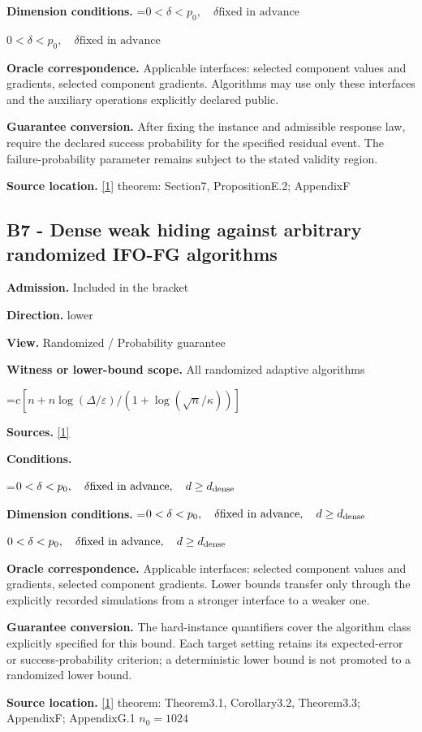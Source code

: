 \documentclass[10pt,a4paper]{article}
\newcommand{\AtlasMath}[1]{\par\begingroup\centering\setbox0=\hbox{$\displaystyle #1$}\ifdim\wd0>1.4\linewidth\typeout{ATLAS WIDE FORMULA: \the\wd0}\fi\ifdim\wd0>\linewidth\resizebox{\linewidth}{!}{\box0}\else\box0\fi\par\endgroup}
\newcommand{\AtlasInlineMath}[1]{\begingroup\setbox0=\hbox{$#1$}\ifdim\wd0>.4\linewidth\endgroup\AtlasMath{#1}\else\endgroup$#1$\fi}
\begin{document}
\textbf{Dimension conditions.} \AtlasInlineMath{0<\delta<p_0,\quad\delta\text{fixed in advance}}

\textbf{Oracle correspondence.} Applicable interfaces: selected component values and gradients, selected component gradients. Algorithms may use only these interfaces and the auxiliary operations explicitly declared public.

\textbf{Guarantee conversion.} After fixing the instance and admissible response law, require the declared success probability for the specified residual event. The failure-probability parameter remains subject to the stated validity region.

\textbf{Source location.} \href{https://arxiv.org/pdf/2609.00045v3}{[1]} theorem: Section7, PropositionE.2; AppendixF

\subsection{B7 - Dense weak hiding against arbitrary randomized IFO-FG algorithms}
\textbf{Admission.} Included in the bracket

\textbf{Direction.} lower

\textbf{View.} Randomized / Probability guarantee

\textbf{Witness or lower-bound scope.} All randomized adaptive algorithms

\AtlasMath{c[n+n\log(\Delta/\varepsilon)/(1+\log(\sqrt n/\kappa))]}
\textbf{Sources.} \href{https://arxiv.org/pdf/2609.00045v3}{[1]}

\textbf{Conditions.} 
\AtlasMath{0<\delta<p_0,\quad\delta\text{fixed in advance},\quad d\ge d_{\rm dense}}


\textbf{Dimension conditions.} \AtlasInlineMath{0<\delta<p_0,\quad\delta\text{fixed in advance},\quad d\ge d_{\rm dense}}

\textbf{Oracle correspondence.} Applicable interfaces: selected component values and gradients, selected component gradients. Lower bounds transfer only through the explicitly recorded simulations from a stronger interface to a weaker one.

\textbf{Guarantee conversion.} The hard-instance quantifiers cover the algorithm class explicitly specified for this bound. Each target setting retains its expected-error or success-probability criterion; a deterministic lower bound is not promoted to a randomized lower bound.

\textbf{Source location.} \href{https://arxiv.org/pdf/2609.00045v3}{[1]} theorem: Theorem3.1, Corollary3.2, Theorem3.3; AppendixF; AppendixG.1 $n_0=1024$
\end{document}
